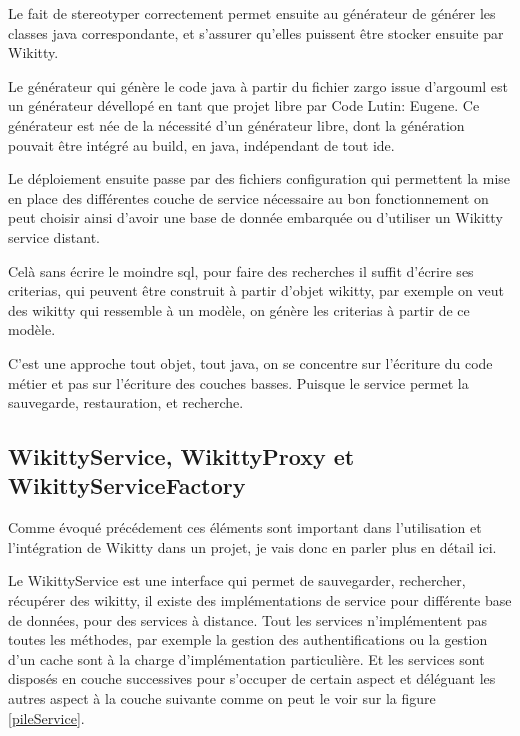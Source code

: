 
Le fait de stereotyper correctement permet ensuite au générateur de générer
les classes java correspondante, et s'assurer qu'elles puissent être stocker
ensuite par Wikitty.

Le générateur qui génère le code java à partir du fichier zargo issue d'argouml
est un générateur dévellopé en tant que projet libre par Code Lutin: Eugene.
Ce générateur est née de la nécessité d'un générateur libre, dont la génération
pouvait être intégré au build, en java, indépendant de tout ide.

Le déploiement ensuite passe par des fichiers configuration qui permettent la
mise en place des différentes couche de service nécessaire au bon fonctionnement
on peut choisir ainsi d'avoir une base de donnée embarquée ou d'utiliser un
Wikitty service distant.

Celà sans écrire le moindre sql, pour faire des recherches il suffit d'écrire
ses criterias, qui peuvent être construit à partir d'objet wikitty, par exemple 
on veut des wikitty qui ressemble à un modèle, on génère les criterias à partir
de ce modèle.

C'est une approche tout objet, tout java, on se concentre sur l'écriture du code
métier et pas sur l'écriture des couches basses. Puisque le service permet la
sauvegarde, restauration, et recherche. 

% 
% 


\subsection{WikittyService, WikittyProxy et WikittyServiceFactory}

Comme évoqué précédement ces éléments sont important dans l'utilisation et 
l'intégration de Wikitty dans un projet, je vais donc en parler plus en détail
ici.

Le WikittyService est une interface qui permet de sauvegarder, rechercher,
récupérer des wikitty, il existe des implémentations de service pour différente
base de données, pour des services à distance. Tout les services n'implémentent 
pas toutes les méthodes, par exemple la gestion des authentifications ou la 
gestion d'un cache sont à la charge d'implémentation particulière. Et les
services sont disposés en couche successives pour s'occuper de certain aspect
et déléguant les autres aspect à la couche suivante comme on peut le voir sur 
la figure \ref{pileService}.

